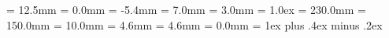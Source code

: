 \pagestyle{empty}              %
\columnsep      =  12.5mm      %
\columnseprule  =   0.0mm      %
\topmargin      =  -5.4mm      %
\headheight     =   7.0mm      %
\headsep        =   3.0mm      %
\topskip        =   1.0ex      %
\textheight     = 230.0mm      %
\textwidth      = 150.0mm      %
\footskip       =  10.0mm      %
\evensidemargin =   4.6mm      %
\oddsidemargin  =   4.6mm      %
\parindent      =   0.0mm      %
\parskip        = 1ex plus .4ex minus .2ex       %
\flushbottom                   %
